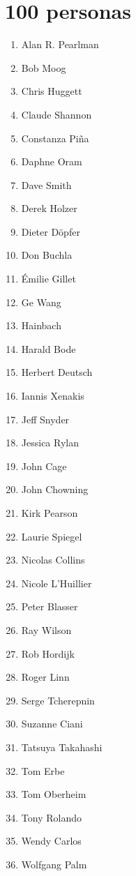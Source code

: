 \documentclass[../principal.tex]{subfiles}
\begin{document}
\chapter{100 personas}

\begin{enumerate}
    \item Alan R. Pearlman
    \item Bob Moog
    \item Chris Huggett
    \item Claude Shannon
    \item Constanza Piña
    \item Daphne Oram
    \item Dave Smith
    \item Derek Holzer
    \item Dieter Döpfer
    \item Don Buchla
    \item Émilie Gillet
    \item Ge Wang
    \item Hainbach
    \item Harald Bode
    \item Herbert Deutsch
    \item Iannis Xenakis
    \item Jeff Snyder
    \item Jessica Rylan
    \item John Cage
    \item John Chowning
    \item Kirk Pearson
    \item Laurie Spiegel
    \item Nicolas Collins
    \item Nicole L'Huillier
    \item Peter Blasser
    \item Ray Wilson
    \item Rob Hordijk
    \item Roger Linn
    \item Serge Tcherepnin
    \item Suzanne Ciani
    \item Tatsuya Takahashi
    \item Tom Erbe
    \item Tom Oberheim
    \item Tony Rolando
    \item Wendy Carlos
    \item Wolfgang Palm

\end{enumerate}
\end{document}
